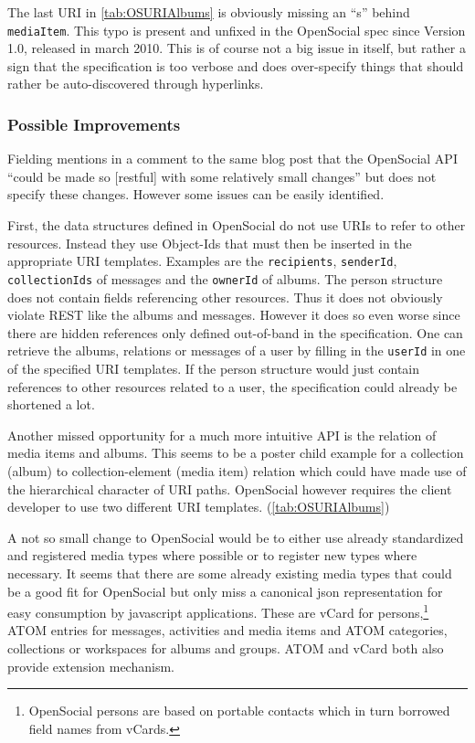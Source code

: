 \documentclass[11pt,a4paper,headsepline,twoside]{scrartcl}		%
\begin{document}
The last URI in \autoref{tab:OSURIAlbums} is obviously missing an ``s'' behind
\texttt{mediaItem}. This typo is present and unfixed in the OpenSocial spec
since Version 1.0, released in march 2010. This is of course not a big issue in
itself, but rather a sign that the specification is too verbose and does
over-specify things that should rather be auto-discovered through hyperlinks.

\subsubsection{Possible Improvements}
\label{sec:poss-impr}

Fielding mentions in a comment to the same blog post \cite{Fielding2008} that the
OpenSocial API ``could be made so [restful] with some relatively small changes''
but does not specify these changes. However some issues can be easily
identified.

First, the data structures defined in OpenSocial do not use URIs to refer to
other resources. Instead they use Object-Ids that must then be inserted in the
appropriate URI templates. Examples are the \texttt{recipients},
\texttt{senderId}, \texttt{collectionIds} of messages and the \texttt{ownerId}
of albums. The person structure does not contain fields referencing other
resources. Thus it does not obviously violate REST like the albums and
messages. However it does so even worse since there are hidden references only
defined out-of-band in the specification. One can retrieve the albums, relations
or messages of a user by filling in the \texttt{userId} in one of the specified
URI templates. If the person structure would just contain references to other
resources related to a user, the specification could already be shortened a lot.

Another missed opportunity for a much more intuitive API is the relation of
media items and albums. This seems to be a poster child example for a collection
(album) to collection-element (media item) relation which could have made use of
the hierarchical character of URI paths. OpenSocial however requires the client
developer to use two different URI templates. (\autoref{tab:OSURIAlbums})

A not so small change to OpenSocial would be to either use already standardized
and registered media types where possible or to register new types where
necessary. It seems that there are some already existing media types that could
be a good fit for OpenSocial but only miss a canonical json representation for
easy consumption by javascript applications. These are vCard for
persons,\footnote{OpenSocial persons are based on portable contacts which in
  turn borrowed field names from vCards.} ATOM entries \cite{RFC4287} for
messages, activities and media items and ATOM categories, collections or
workspaces \cite{RFC5023} for albums and groups. ATOM and vCard both also provide
extension mechanism.
  
\end{document}
